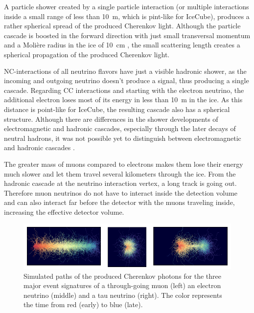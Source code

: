 A particle shower created by a single particle interaction (or multiple interactions inside a small range of less than \SI{10}{m}, which is pint-like for IceCube), produces a rather spherical spread of the produced Cherenkov light.
Although the particle cascade is boosted in the forward direction with just small transversal momentum and a Moli\`{e}re radius in the ice of \SI{10}{cm} \cite{PDG20}, the small scattering length creates a spherical propagation of the produced Cherenkov light.

NC-interactions of all neutrino flavors have just a visible hadronic shower, as the incoming and outgoing neutrino doesn't produce a signal, thus producing a single cascade.
Regarding CC interactions and starting with the electron neutrino, the additional electron loses most of its energy in less than \SI{10}{m} in the ice.
As this distance is point-like for IceCube, the resulting cascade also has a spherical structure.
Although there are differences in the shower developments of electromagnetic and hadronic cascades, especially through the later decays of neutral hadrons, it was not possible yet to distinguish between electromagnetic and hadronic cascades \cite{Steuer17ICRC}.

The greater mass of muons compared to electrons makes them lose their energy much slower and let them travel several kilometers through the ice.
From the hadronic cascade at the neutrino interaction vertex, a long track is going out.
Therefore muon neutrinos do not have to interact inside the detection volume and can also interact far before the detector with the muons traveling inside, increasing the effective detector volume.
\begin{figure}
    \centering
    \includegraphics[width=\textwidth]{./images/icecube_sim_event_signatures.pdf}
    \caption{Simulated paths of the produced Cherenkov photons for the three major event signatures of a through-going muon (left) an electron neutrino (middle) and a tau neutrino (right). The color represents the time from red (early) to blue (late). \cite{IceCube18Sim}}
    \label{fig:icecube_event_signatures}
\end{figure}

